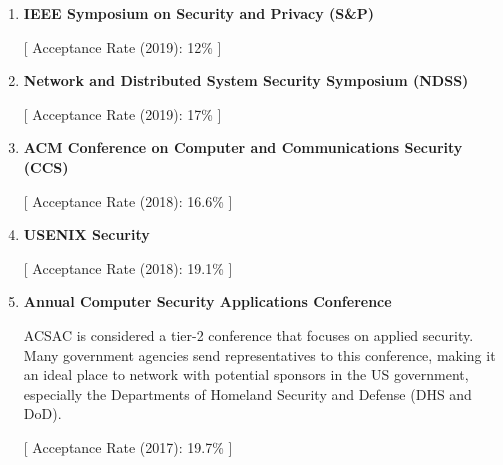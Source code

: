 \begin{enumerate}[resume]
\tightlist
\item \textbf{IEEE Symposium on Security and Privacy (S\&P)}

[ Acceptance Rate (2019): 12\% ]

\item \textbf{Network and Distributed System Security Symposium (NDSS)}

[ Acceptance Rate (2019): 17\% ]

\item \textbf{ACM Conference on Computer and Communications Security (CCS)}

[ Acceptance Rate (2018): 16.6\% ]

\item \textbf{USENIX Security}

[ Acceptance Rate (2018): 19.1\% ]

\item \textbf{Annual Computer Security Applications Conference}

ACSAC is considered a tier-2 conference that focuses on applied security. Many government agencies send representatives to this conference, making it an ideal place to network with potential sponsors in the US government, especially the Departments of Homeland Security and Defense (DHS and DoD).

[ Acceptance Rate (2017): 19.7\% ]

\end{enumerate}

